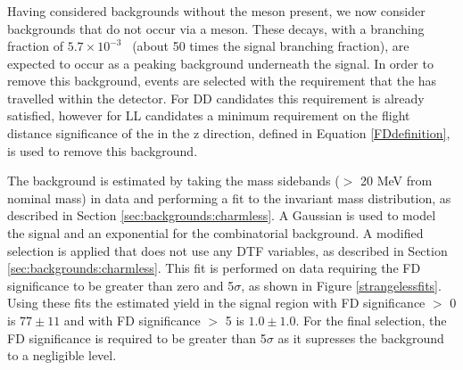 \subsubsection{\boldmath \decay{\Bm}{\D\pim\pip\pim}}
\label{sec:backgrounds:b2dpipipi}

Having considered backgrounds without the \Dz meson present, we now consider backgrounds that do not occur via a \KS meson. These \decay{\Bm}{\D\pim\pip\pim} decays, with a branching fraction of $5.7 \times 10^{-3}$~\cite{PDG2014} (about 50 times the signal \decay{\Bm}{\D\Kstarm(\KS(\pip\pim)\pim)} branching fraction), are expected to occur as a peaking background underneath the signal. In order to remove this background, events are selected with the requirement that the \KS has travelled within the detector. For DD candidates this requirement is already satisfied, however for LL candidates a minimum requirement on the flight distance significance of the \KS in the z direction, defined in Equation \ref{FDdefinition}, is used to remove this background. 

The \decay{\Bm}{\D\pim\pip\pim} background is estimated by taking the \KS mass sidebands ($>$ 20 MeV from nominal \KS mass) in data and performing a fit to the invariant \Bm mass distribution, as described in Section \ref{sec:backgrounds:charmless}. A Gaussian is used to model the signal and an exponential for the combinatorial background. A modified selection is applied that does not use any DTF variables, as described in Section \ref{sec:backgrounds:charmless}. This fit is performed on \kpi data requiring the \KS FD significance to be greater than zero and 5$\sigma$, as shown in Figure \ref{strangelessfits}. Using these fits the estimated \decay{\Bm}{\D\pim\pip\pim} yield in the signal region with \KS FD significance $>$ 0 is $77 \pm 11$ and with \KS FD significance $>$ 5 is $1.0 \pm 1.0$. For the final selection, the \KS FD significance is required to be greater than 5$\sigma$ as it supresses the \decay{\Bm}{\D\pim\pip\pim} background to a negligible level.


